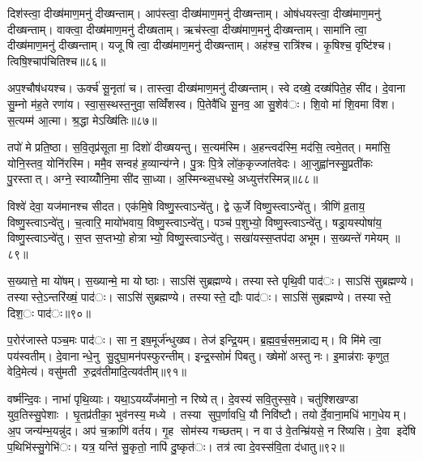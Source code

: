 दिश॑स्त्वा॒ दीख्ष॑माण॒मनु॑ दीख्षन्ताम्। आप॑स्त्वा॒ दीख्ष॑माण॒मनु॑ दीख्षन्ताम्। ओष॑धयस्त्वा॒ दीख्ष॑माण॒मनु॑ दीख्षन्ताम्। वाक्त्वा॒ दीख्ष॑माण॒मनु॑ दीख्षताम्। ऋच॑स्त्वा॒ दीख्ष॑माण॒मनु॑ दीख्षन्ताम्। सामा॑नि त्वा॒ दीख्ष॑माण॒मनु॑ दीख्षन्ताम्। यजूषि त्वा॒ दीख्ष॑माण॒मनु॑ दीख्षन्ताम्। अह॑श्च॒ रात्रि॑श्च। कृ॒षिश्च॒ वृष्टि॑श्च। त्विषि॒श्चाप॑चितिश्च॥८६॥

अप॒श्चौष॑धयश्च। ऊर्क्च॑ सू॒नृता॑ च। तास्त्वा॒ दीख्ष॑माण॒मनु॑ दीख्षन्ताम्। स्वे दख्षे॒ दख्ष॑पिते॒ह सी॑द। दे॒वाना सु॒म्नो म॑ह॒ते रणा॑य। स्वा॒स॒स्थस्त॒नुवा॒ सव्विँ॑शस्व। पि॒तेवै॑धि सू॒नव॒ आ सु॒शेव॑ः। शि॒वो मा॑ शि॒वमा वि॑श। स॒त्यम्म॑ आ॒त्मा। श्र॒द्धा मेऽख्षि॑तिः॥८७॥

तपो॑ मे प्रति॒ष्ठा। स॒वि॒तृप्र॑सूता मा॒ दिशो॑ दीख्षयन्तु। स॒त्यम॑स्मि। अ॒हन्त्वद॑स्मि॒ मद॑सि॒ त्वमे॒तत्। ममा॑सि॒ योनि॒स्तव॒ योनि॑रस्मि। ममै॒व सन्वह॑ ह॒व्यान्य॑ग्ने। पु॒त्रः पि॒त्रे लो॑क॒कृज्जा॑तवेदः। आ॒जुह्वा॑नस्सु॒प्रती॑कः पु॒रस्तात्। अग्ने॒ स्वाय्योँनि॒मा सी॑द सा॒ध्या। अ॒स्मिन्थ्स॒धस्थे॒ अध्युत्त॑रस्मिन्न्॥८८॥

विश्वे॑ देवा॒ यज॑मानश्च सीदत। एक॑मि॒षे विष्णु॒स्त्वाऽन्वे॑तु। द्वे ऊ॒र्जे विष्णु॒स्त्वाऽन्वे॑तु। त्रीणि॑ व्र॒ताय॒ विष्णु॒स्त्वाऽन्वे॑तु। च॒त्वारि॒ मायो॑भवाय॒ विष्णु॒स्त्वाऽन्वे॑तु। पञ्च॑ प॒शुभ्यो॒ विष्णु॒स्त्वाऽन्वे॑तु। षड्रा॒यस्पोषा॑य॒ विष्णु॒स्त्वाऽन्वे॑तु। स॒प्त स॒प्तभ्यो॒ होत्राभ्यो॒ विष्णु॒स्त्वाऽन्वे॑तु। सखा॑यस्स॒प्तप॑दा अभूम। स॒ख्यन्ते॑ गमेयम् ॥८९॥

स॒ख्यात्ते॒ मा यो॑षम्। स॒ख्यान्मे॒ मा योष्ठाः। साऽसि॑ सुब्रह्मण्ये। तस्यास्ते पृथि॒वी पाद॑ः। साऽसि॑ सुब्रह्मण्ये। तस्यास्ते॒ऽन्तरि॑ख्षं॒ पाद॑ः। साऽसि॑ सुब्रह्मण्ये। तस्यास्ते॒ द्यौः पाद॑ः। साऽसि॑ सुब्रह्मण्ये। तस्यास्ते॒ दिश॒ः पाद॑ः॥९०॥

प॒रोर॑जास्ते पञ्च॒मः पाद॑ः। सा न॒ इष॒मूर्ज॑न्धुख्ष्व। तेज॑ इन्द्रि॒यम्। ब्र॒ह्म॒व॒र्च॒सम॒न्नाद्यम्। वि मि॑मे त्वा॒ पय॑स्वतीम्। दे॒वानान्धे॒नु सु॒दुघा॒मन॑पस्फुरन्तीम्। इन्द्र॒स्सोमं॑ पिबतु। ख्षेमो॑ अस्तु नः। इ॒मान्न॑राः कृणुत॒ वेदि॒मेत्य॑। वसु॑मती रु॒द्रव॑तीमादि॒त्यव॑तीम्॥९१॥

वर्ष्म॑न्दि॒वः। नाभा॑ पृथि॒व्याः। यथा॒ऽयय्यँज॑मानो॒ न रिष्येत्। दे॒वस्य॑ सवि॒तुस्स॒वे। चतु॑श्शिखण्डा युव॒तिस्सु॒पेशाः। घृ॒तप्र॑तीका॒ भुव॑नस्य॒ मध्ये। तस्या सुप॒र्णावधि॒ यौ निवि॑ष्टौ। तयोर्दे॒वाना॒मधि॑ भाग॒धेयम्। अ॒प जन्य॑म्भ॒यन्नु॑द। अप॑ च॒क्राणि॑ वर्तय। गृ॒ह सोम॑स्य गच्छतम्। न वा उ॑ वे॒तन्म्रि॑यसे॒ न रि॑ष्यसि। दे॒वा इदे॑षि प॒थिभि॑स्सु॒गेभि॑ः। यत्र॒ यन्ति॑ सु॒कृतो॒ नापि॑ दु॒ष्कृत॑ः। तत्र॑ त्वा दे॒वस्स॑वि॒ता द॑धातु॥९२॥


